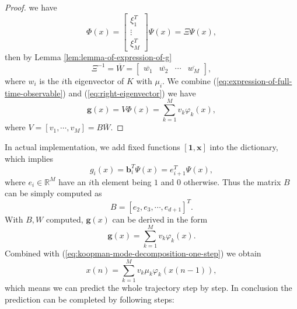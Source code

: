 \documentclass[en, bibend=bibtex]{elegantpaper}
\theoremstyle{plain}
\begin{document}
\begin{proof}
  we have
  \begin{equation*}
    \Phi(x) = \left[
      \begin{array}{c}
        \xi_1^T\\
        \vdots\\
        \xi_M^T
      \end{array}
    \right] \Psi(x) = \Xi \Psi(x),
  \end{equation*}
  then by Lemma \ref{lem:lemma-of-expression-of-g}
  \begin{equation}
    \label{eq:right-eigenvector}
    \Xi^{-1} = \overline{W}
    = \left[
      \begin{array}{cccc}
        \overline{w_1}&\overline{w_2}&\cdots&\overline{w_M}
      \end{array}
    \right],
  \end{equation}
  where $w_i$ is the $i$th eigenvector of $K$ with $\mu_i$.
  We combine (\ref{eq:expression-of-full-time-observable})
  and (\ref{eq:right-eigenvector})
  we have
  \begin{equation}
    \label{eq:expression-of-g}
    \mathbf{g}(x) = V \Phi(x) = \sum\limits_{k = 1}^M v_k \varphi_k(x),
  \end{equation}
  where $V = [v_1,\cdots,v_M] = B\overline{W} $.
\end{proof}

In actual implementation,
we add fixed functions
$[\mathbf{1}, \mathbf{x}]$ into the dictionary,
which implies
\begin{equation*}
g_i(x) = \mathbf{b}_i^T \Psi(x) = e_{i+1}^T \Psi(x),
\end{equation*}
where $e_i \in \mathbb{R}^M$ have an $i$th element being $1$
and $0$ otherwise.
Thus the matrix $B$ can be simply computed as
\begin{equation*}
  B = [e_2, e_3, \cdots, e_{d+1}]^T.
\end{equation*}
With $B, W$ computed, $\mathbf{g}(x)$ can be derived in the form
\begin{equation*}
  \mathbf{g}(x) = \sum\limits_{k = 1}^M v_k\varphi_k(x).
\end{equation*}
Combined with (\ref{eq:koopman-mode-decomposition-one-step}) we obtain
\begin{equation*}
  x(n) = \sum\limits_{k = 1}^M v_k \mu_k \varphi_k(x(n-1)),
\end{equation*}
which means we can predict the whole trajectory step by step.
In conclusion the prediction can be completed by following steps:
\end{document}
